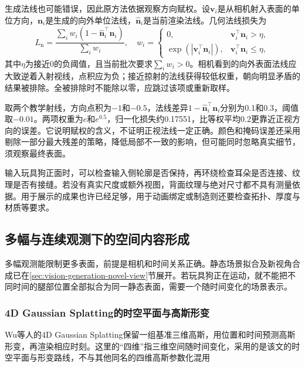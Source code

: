 生成法线也可能错误，因此原方法依据观察方向赋权。设$\bm v_i$是从相机射入表面的单位方向，$\bm n_i$是生成的向外单位法线，$\widehat{\bm n}_i$是当前渲染法线。几何法线损失为
\begin{equation}
 L_{\mathrm n}
 =\frac{\sum_i w_i(1-\widehat{\bm n}_i^\top\bm n_i)}
         {\sum_i w_i},
 \quad
 w_i=
 \begin{cases}
  0,&\bm v_i^\top\bm n_i>\eta,\\
  \exp(|\bm v_i^\top\bm n_i|),&\bm v_i^\top\bm n_i\leq\eta,
 \end{cases}
 \label{eq:vision-wonder-normal}
\end{equation}
其中$\eta$为接近0的负阈值，且当前批次要求$\sum_iw_i>0$。相机看到的向外表面法线应大致逆着入射视线，点积应为负；接近掠射的法线获得较低权重，朝向明显矛盾的结果被排除。全被排除时不能除以零，应跳过该项或重新取样。

取两个教学射线，方向点积为$-1$和$-0.5$，法线差异$1-\widehat{\bm n}_i^\top\bm n_i$分别为0.1和0.3，阈值取$-0.01$。两项权重为$e$和$e^{0.5}$，归一化损失约0.17551，比等权平均0.2更靠近正视方向的误差。它说明赋权的含义，不证明正视法线一定正确。颜色和掩码误差还采用剔除一部分最大残差的策略，降低局部不一致的影响，但可能同时忽略真实细节，须观察最终表面。

输入玩具狗正面时，可以检查输入侧轮廓是否保持，再环绕检查耳朵是否连接、纹理是否有接缝。若没有真实尺度或额外视图，背面纹理与绝对尺寸都不具有测量依据。用于展示的成果也许已经足够，用于动画绑定或制造则还要检查拓扑、厚度与材质等要求。

\subsection{多幅与连续观测下的空间内容形成}
\label{sec:vision-multigen-observed-space}

多幅观测能限制更多表面，前提是相机和时间关系正确。静态场景拟合及新视角合成已在\ref{sec:vision-generation-novel-view}节展开。若玩具狗正在运动，就不能把不同时间的腿部位置全部拟合为同一静态表面，需要一个随时间变化的场景表示。

\subsubsection{4D Gaussian Splatting的时空平面与高斯形变}
\label{sec:vision-multigen-4dgs}

Wu等人的4D Gaussian Splatting保留一组基准三维高斯，用位置和时间预测高斯形变，再渲染相应时刻。这里的“四维”指三维空间随时间变化，采用的是该文的时空平面与形变路线，不与其他同名的四维高斯参数化混用

